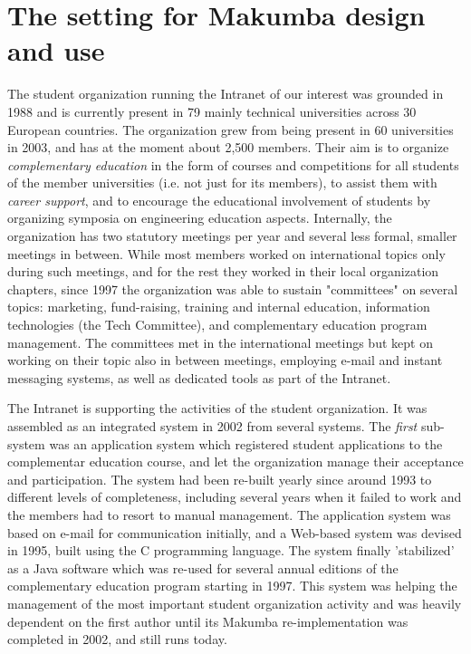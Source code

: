 \documentclass{llncs}
\begin{document}
\section{The setting for Makumba design and use}\label{sec:setting}
The student organization running the Intranet of our interest was grounded in 1988 and is currently present in 79 mainly technical universities across 30 European countries. The organization grew from being present in 60 universities in 2003, and has at the moment about 2,500 members. Their aim is to organize {\it complementary education} in the form of courses and competitions for all students of the member universities (i.e. not just for its members), to assist them with {\it career support}, and to encourage the educational involvement of students by organizing symposia on engineering education aspects.
Internally, the organization has two statutory meetings per year and several less formal, smaller meetings in between. While most members worked on international topics only during such meetings, and for the rest they worked in their local organization chapters, since 1997 the organization was able to sustain "committees" on several topics: marketing, fund-raising, training and internal education, information technologies (the Tech Committee), and complementary education program management. The committees met in the international meetings but kept on working on their topic also in between meetings, employing e-mail and instant messaging systems, as well as dedicated tools as part of the Intranet.

The Intranet is supporting the activities of the student organization. It was assembled as an integrated system in 2002 from several systems. The {\it first} sub-system was an application system which registered student applications to the complementar education course, and let the organization manage their acceptance and participation. The system had been re-built yearly since around 1993 to different levels of completeness, including several years when it failed to work and the members had to resort to manual management. The application system was based on e-mail for communication initially, and a Web-based system was devised in 1995, built using the C programming language. The system finally 'stabilized' as a Java software which was re-used for several annual editions of the complementary education program starting in 1997. This system was helping the management of the most important student organization activity and was heavily dependent on the first author until its Makumba re-implementation was completed in 2002, and still runs today.
\end{document}
